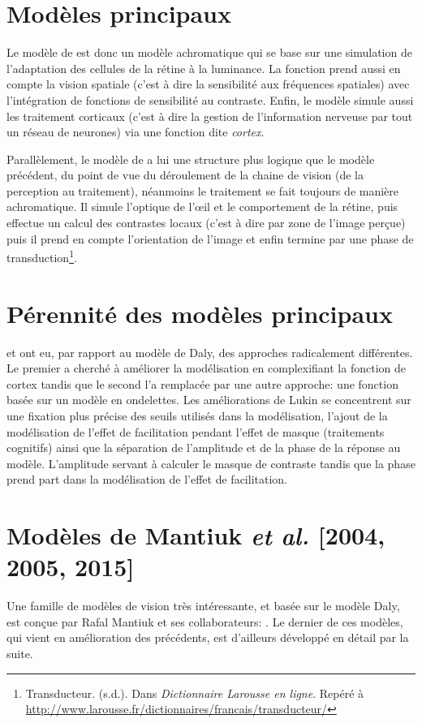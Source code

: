 	\section{Modèles principaux}
	\par Le modèle de \citep{daly_visible_1992} est donc un modèle achromatique qui se base sur une simulation de l'adaptation des cellules de la rétine à la luminance. La fonction prend aussi en compte la vision spatiale (c'est à dire la sensibilité aux fréquences spatiales) avec l'intégration de fonctions de sensibilité au contraste. Enfin, le modèle simule aussi les traitement corticaux (c'est à dire la gestion de l'information nerveuse par tout un réseau de neurones) via une fonction dite \textit{cortex}.
		
	\par Parallèlement, le modèle de \citep{lubin_visual_1995} a lui une structure plus logique que le modèle précédent, du point de vue du déroulement de la chaine de vision (de la perception au traitement), néanmoins le traitement se fait toujours de manière achromatique. Il simule l'optique de l'œil et le comportement de la rétine, puis effectue un calcul des contrastes locaux (c'est à dire par zone de l'image perçue) puis il prend en compte l'orientation de l'image et enfin termine par une phase de transduction\footnote{Transducteur. (s.d.). Dans \textit{Dictionnaire Larousse en ligne}. Repéré à \url{http://www.larousse.fr/dictionnaires/francais/transducteur/}}.
	
	\section{Pérennité des modèles principaux}
	\par \citep{lukin_improved_2009} et \citep{bradley_wavelet_1999} ont eu, par rapport au modèle de Daly, des approches radicalement différentes. Le premier a cherché à améliorer la modélisation en complexifiant la fonction de cortex tandis que le second l'a remplacée par une autre approche: une fonction basée sur un modèle en ondelettes.
	Les améliorations de Lukin se concentrent sur une fixation plus précise des seuils utilisés dans la modélisation, l'ajout de la modélisation de l'effet de facilitation pendant l'effet de masque (traitements cognitifs) ainsi que la séparation de l'amplitude et de la phase de la réponse au modèle. L'amplitude servant à calculer le masque de contraste tandis que la phase prend part dans la modélisation de l'effet de facilitation.
	
	\section{Modèles de Mantiuk \textit{et al.} [2004, 2005, 2015]}
	\par Une famille de modèles de vision très intéressante, et basée sur le modèle Daly, est conçue par Rafal Mantiuk et ses collaborateurs: \citep{mantiuk_visible_2004,mantiuk_predicting_2005,mantiuk_human_2015}. Le dernier de ces modèles, qui vient en amélioration des précédents, est d'ailleurs développé en détail par la suite.
	
